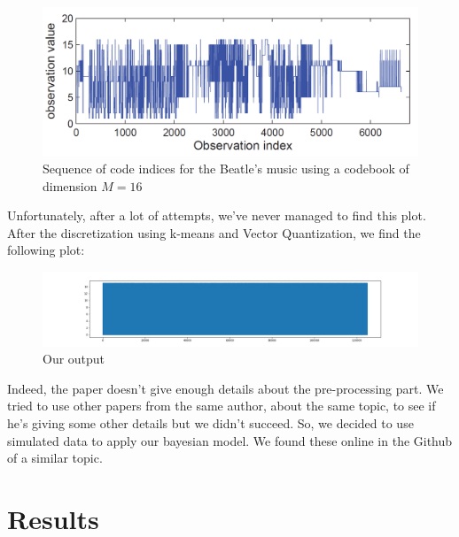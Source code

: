 \begin{figure}[h]
    \centering
  	\includegraphics[scale=0.25]{Graphics/output.PNG} 
   	\caption{Sequence of code indices for the Beatle's music using a codebook of dimension $M = 16$}
\end{figure}

Unfortunately, after a lot of attempts, we've never managed to find this plot. After the discretization using k-means and Vector Quantization, we find the following plot:
\begin{figure}[h]
    \centering
  	\includegraphics[scale=0.25]{Graphics/ouroutput.PNG} 
   	\caption{Our output}
\end{figure}

Indeed, the paper doesn't give enough details about the pre-processing part. We tried to use other papers from the same author, about the same topic, to see if he's giving some other details but we didn't succeed. So, we decided to use simulated data to apply our bayesian model. We found these online in the Github of a similar topic.



\section{Results}

